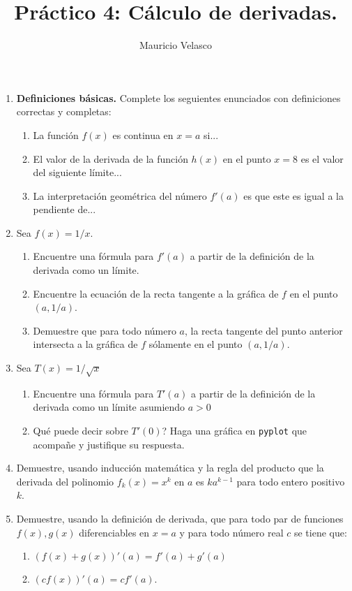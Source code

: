 \documentclass[12pt, a4paper]{article}
\date{}
\begin{document}
\title{Pr\'actico 4: Cálculo de derivadas.}
\author{Mauricio Velasco}
\maketitle{}
\begin{enumerate}
\item {\bf Definiciones básicas.} Complete los seguientes enunciados con definiciones correctas y completas:
\begin{enumerate}
\item La función $f(x)$ es continua en $x=a$ si...
\item El valor de la derivada de la función $h(x)$ en el punto $x=8$ es el valor del siguiente límite...
\item La interpretación geométrica del número $f'(a)$ es que este es igual a la pendiente de...
\end{enumerate}


\item Sea $f(x)=1/x$. 
\begin{enumerate}
\item Encuentre una fórmula para $f'(a)$ a partir de la definición de la derivada como un límite.
\item Encuentre la ecuación de la recta tangente a la gráfica de $f$ en el punto $(a,1/a)$.
\item Demuestre que para todo número $a$, la recta tangente del punto anterior intersecta a la gráfica de $f$ sólamente en el punto $(a,1/a)$. 
\end{enumerate}
\item Sea $T(x)=1/\sqrt{x}$
\begin{enumerate}
\item Encuentre una fórmula para $T'(a)$ a partir de la definición de la derivada como un límite asumiendo $a>0$
\item Qué puede decir sobre $T'(0)$? Haga una gráfica en \verb!pyplot! que acompañe y justifique su respuesta.
\end{enumerate}

\item Demuestre, usando inducción matemática y la regla del producto que la derivada del polinomio $f_k(x)=x^k$ en $a$ es $ka^{k-1}$ para todo entero positivo $k$.

\item Demuestre, usando la definición de derivada, que para todo par de funciones $f(x),g(x)$  diferenciables en $x=a$ y para todo número real $c$ se tiene que:
\begin{enumerate}
\item $\left(f(x)+g(x)\right)'(a) = f'(a)+g'(a)$
\item $\left(cf(x)\right)'(a)= cf'(a)$.
\end{enumerate} 




\end{enumerate}
\end{document}
